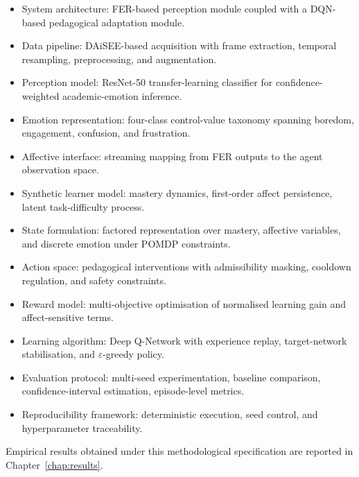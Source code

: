 \begin{itemize}
\item System architecture: \ac{FER}-based perception module coupled with a \ac{DQN}-based pedagogical adaptation module.

\item Data pipeline: \ac{DAiSEE}-based acquisition with frame extraction, temporal resampling, preprocessing, and augmentation.

\item Perception model: ResNet-50 transfer-learning classifier for confidence-weighted academic-emotion inference.

\item Emotion representation: four-class control-value taxonomy spanning boredom, engagement, confusion, and frustration.

\item Affective interface: streaming mapping from \ac{FER} outputs to the agent observation space.

\item Synthetic learner model: mastery dynamics, first-order affect persistence, latent task-difficulty process.

\item State formulation: factored representation over mastery, affective variables, and discrete emotion under \ac{POMDP} constraints.

\item Action space: pedagogical interventions with admissibility masking, cooldown regulation, and safety constraints.

\item Reward model: multi-objective optimisation of normalised learning gain and affect-sensitive terms.

\item Learning algorithm: Deep Q-Network with experience replay, target-network stabilisation, and $\varepsilon$-greedy policy.

\item Evaluation protocol: multi-seed experimentation, baseline comparison, confidence-interval estimation, episode-level metrics.

\item Reproducibility framework: deterministic execution, seed control, and hyperparameter traceability.


\end{itemize}

Empirical results obtained under this methodological specification are reported in Chapter~\ref{chap:results}.
